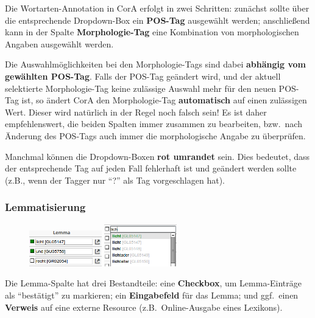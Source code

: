 \documentclass[11pt,a4paper,parskip=half]{scrartcl}
\begin{document}
Die Wortarten-Annotation in CorA erfolgt in zwei Schritten: zunächst
sollte über die entsprechende Dropdown-Box ein \textbf{POS-Tag}
ausgewählt werden; anschließend kann in der Spalte
\textbf{Morphologie-Tag} eine Kombination von morphologischen Angaben
ausgewählt werden.

Die Auswahlmöglichkeiten bei den Morphologie-Tags sind dabei
\textbf{abhängig vom gewählten POS-Tag}.  Falls der POS-Tag geändert
wird, und der aktuell selektierte Morphologie-Tag keine zulässige
Auswahl mehr für den neuen POS-Tag ist, so ändert CorA den
Morphologie-Tag \textbf{automatisch} auf einen zulässigen Wert.
Dieser wird natürlich in der Regel noch falsch sein!  Es ist daher
empfehlenswert, die beiden Spalten immer zusammen zu bearbeiten, bzw.\
nach Änderung des POS-Tags auch immer die morphologische Angabe zu
überprüfen.

Manchmal können die Dropdown-Boxen \textbf{rot umrandet} sein.  Dies
bedeutet, dass der entsprechende Tag auf jeden Fall fehlerhaft ist und
geändert werden sollte (z.B., wenn der Tagger nur "`?"' als Tag
vorgeschlagen hat).

\subsubsection{Lemmatisierung}

\begin{figure}\vspace{-2em}
  \begin{center}
    \includegraphics[width=0.28\textwidth]{img/1.2/lemma.png}\vspace{20px}
    \includegraphics[width=0.28\textwidth]{img/lemma-edit.png}
  \end{center}
\end{figure}

Die Lemma-Spalte hat drei Bestandteile: eine \textbf{Checkbox}, um
Lemma-Einträge als "`bestätigt"' zu markieren; ein \textbf{Eingabefeld} für das
Lemma; und ggf.\ einen \textbf{Verweis} auf eine externe Resource (z.B.\
Online-Ausgabe eines Lexikons).
\end{document}
